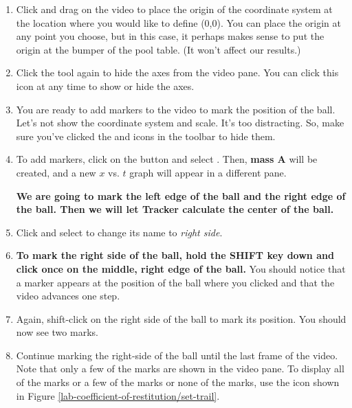 \begin{enumerate}

	\item Click and drag on the video to place the origin of the coordinate system at the location where you would like to define (0,0). You can place the origin at any point you choose, but in this case, it perhaps makes sense to put the origin at the bumper of the pool table. (It won't affect our results.)
	
	\item Click the  tool again to hide the axes from the video pane. You can click this icon at any time to show or hide the axes.

	\item You are ready to add markers to the video to mark the position of the ball. Let's not show the coordinate system and scale. It's too distracting. So, make sure you've clicked the  and  icons in the toolbar to hide them.
		
	\item To add markers, click on the  button and select . Then, {\bf mass A} will be created, and a new $x$ vs. $t$ graph will appear in a different pane. 
		
	{\bf We are going to mark the left edge of the ball and the right edge of the ball. Then we will let Tracker calculate the center of the ball.}
	
	\item Click  and select  to change its name to \emph{right side}.
	
	\item  {\bf To mark the right side of the ball, hold the SHIFT key down and click once on the middle, right edge of the ball.} You should notice that a marker appears at the position of the ball where you clicked and that the video advances one step.
	
	\item Again, shift-click on the right side of the ball to mark its position. You should now see two marks.
	
	\item Continue marking the right-side of the ball until the last frame of the video. Note that only a few of the marks are shown in the video pane. To display all of the marks or a few of the marks or none of the marks, use the  icon shown in Figure \ref{lab-coefficient-of-restitution/set-trail}.


\end{enumerate}
